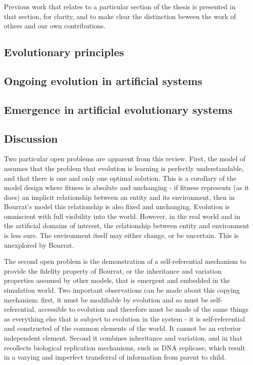 \documentclass[]{report}
\begin{document}
Previous work that relates to a particular section of the thesis is presented in that section, for clarity, and to make clear the distinction beween the work of others and our own contributions.

\subsection{Evolutionary principles}
\subsection{Ongoing evolution in artificial systems}
\subsection{Emergence in artificial evolutionary systems}

\subsection{Discussion}

Two particular open problems are apparent from this review. First, the model of \cite{Bourrat2015} assumes that the problem that evolution is learning is perfectly understandable, and that there is one and only one optimal solution. This is a corollary of the model design where fitness is absolute and unchanging - if fitness represents (as it does) an implicit relationship between an entity and its environment, then in Bourrat's model this relationship is also fixed and unchanging. Evolution is omniscient with full visibility into the world. However, in the real world and in the artificial domains of interest, the relationship between entity and environment is less sure. The environment itself may either change, or be uncertain. This is unexplored by Bourrat.

The second open problem is the demonstration of a self-referential mechanism to provide the fidelity property of Bourrat, or the inheritance and variation properties assumed by other models, that is emergent and embedded in the simulation world. Two important observations can be made about this copying mechanism: first, it must be modifiable by evolution and so must be self-referential, accessible to evolution and therefore must be made of the same things as everything else that is subject to evolution in the system - it is self-referential and constructed of the common elements of the world. It cannot be an exterior independent element. Second it combines inheritance and variation, and in that recollects biological replication mechanisms, such as DNA replicase, which result in a varying and imperfect transferral of information from parent to child. 
\end{document}
